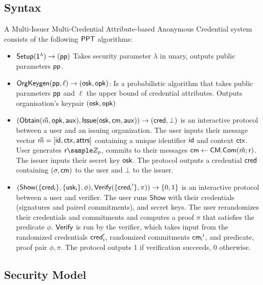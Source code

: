 \subsection{Syntax}
\begin{definition} A Multi-Issuer Multi-Credential Attribute-based Anonymous Credential system consists of the following $\mathsf{PPT}$ algorithms:
    \begin{itemize}
    \item $\mathsf{Setup}(\mathsf{1^{\lambda}}) \to (\mathsf{pp})$ Takes security parameter $\lambda$ in unary, outputs public parameters $\mathsf{pp}$.
    
    \item $\mathsf{OrgKeygen}(\mathsf{pp}, \ell) \to (\mathsf{osk}, \mathsf{opk})$: Is a probabilistic algorithm that takes public parameters $\mathsf{pp}$ and $\ell$ the upper bound of credential attributes. Outputs organisation's keypair $(\mathsf{osk}, \mathsf{opk})$
       
    \item $(\mathsf{Obtain}(\vec{m}, \mathsf{opk}, \mathsf{aux}), \mathsf{Issue}(\mathsf{osk}, \mathsf{cm}, \mathsf{aux})) \rightarrow (\mathsf{cred}, \bot)$ is an interactive protocol between a user and an issuing organization. The user inputs their message vector $\vec{m} = [\mathsf{id}, \mathsf{ctx}, \mathsf{attrs}]$ containing a unique identifier $\mathsf{id}$ and context $\mathsf{ctx}$. User generates $\usk \sample Z_p$, commits to their messages $\mathsf{cm} \gets \mathsf{CM.Com}(\vec{m}; \mathsf{r})$. The issuer inputs their secret key $\mathsf{osk}$. The protocol outputs a credential $\mathsf{cred}$ containing $(\sigma, \mathsf{cm})$ to the user and $\bot$ to the issuer.    
    
    \item $(\mathsf{Show}(\{\mathsf{cred_i}\}, \{\mathsf{usk_i}\}, \phi), \mathsf{Verify}(\{\mathsf{cred_i}'\}, \pi)) \rightarrow \{0,1\}$ is an interactive protocol between a user and verifier. The user runs $\mathsf{Show}$ with their credentials (signatures and paired commitments), and secret keys. The user rerandomizes their credentials and commitments and computes a proof $\pi$ that satisfies the predicate $\phi$.
    $\mathsf{Verify}$ is run by the verifier, which takes input from the randomized credentials $\mathsf{cred}_i'$, randomized commitments $\mathsf{cm_i}'$, and predicate, proof pair $\phi, \pi$. The protocol outputs 1 if verification succeeds, 0 otherwise.
    \end{itemize}
\end{definition}

\newpage
\subsection{Security Model}

